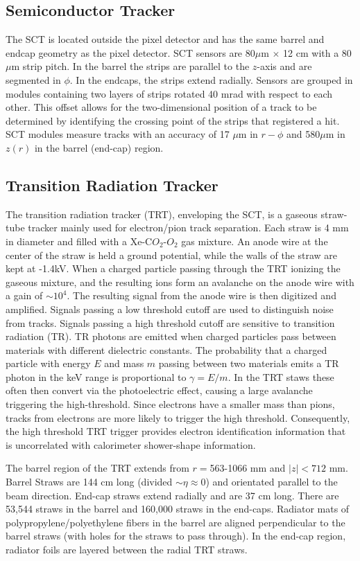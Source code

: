\subsection{Semiconductor Tracker}
The SCT is located outside the pixel detector and has the same barrel and endcap geometry as the pixel detector. SCT sensors are 80$\mu$m $\times$ 12 cm with a 80$\mu$m strip pitch. In the barrel the strips are parallel to the $z$-axis and are segmented in $\phi$. In the endcaps, the strips extend radially. Sensors are grouped in modules containing two layers of strips rotated 40 mrad with respect to each other. This offset allows for the two-dimensional position of a track to be determined by identifying the crossing point of the strips that registered a hit. SCT modules measure tracks with an accuracy of 17 $\mu$m in $r-\phi$ and 580$\mu$m in $z(r)$ in the barrel (end-cap) region.
\subsection{Transition Radiation Tracker}
The transition radiation tracker (TRT), enveloping the SCT, is a gaseous straw-tube tracker mainly used for electron/pion track separation. Each straw is 4 mm in diameter and filled with a Xe-C$O_{2}$-$O_{2}$ gas mixture. An anode wire at the center of the straw is held a ground potential, while the walls of the straw are kept at -1.4kV. When a charged particle passing through the TRT ionizing the gaseous mixture, and the resulting ions form an avalanche on the anode wire with a gain of $\sim 10^{4}$. The resulting signal from the anode wire is then digitized and amplified. Signals passing a low threshold cutoff are used to distinguish noise from tracks. Signals passing a high threshold cutoff are sensitive to transition radiation (TR). TR photons are emitted when charged particles pass between materials with different dielectric constants. The probability that a charged particle with energy $E$ and mass $m$ passing between two materials emits a TR photon in the keV range is proportional to $\gamma=E/m$. In the TRT staws these often then convert via the photoelectric effect, causing a large avalanche triggering the high-threshold. Since electrons have a smaller mass than pions, tracks from electrons are more likely to trigger the high threshold. Consequently, the high threshold TRT trigger provides electron identification information that is uncorrelated with calorimeter shower-shape information.

The barrel region of the TRT extends from $r=$563-1066 mm and $|z| < 712$ mm. Barrel Straws are 144 cm long (divided  $\sim \eta \approx 0$) and orientated parallel to the beam direction. End-cap straws extend radially and are 37 cm long. There are 53,544 straws in the barrel and 160,000 straws in the end-caps. Radiator mats of polypropylene/polyethylene fibers in the barrel are aligned perpendicular to the barrel straws (with holes for the straws to pass through). In the end-cap region, radiator foils are layered between the radial TRT straws. 

